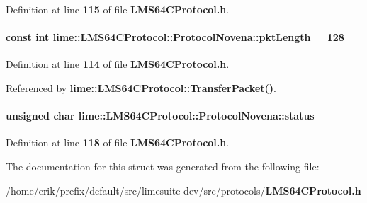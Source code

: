 Definition at line {\bf 115} of file {\bf L\+M\+S64\+C\+Protocol.\+h}.

\paragraph[{pkt\+Length}]{\setlength{\rightskip}{0pt plus 5cm}const {\bf int} lime\+::\+L\+M\+S64\+C\+Protocol\+::\+Protocol\+Novena\+::pkt\+Length = 128\hspace{0.3cm}{\ttfamily [static]}}\label{structlime_1_1LMS64CProtocol_1_1ProtocolNovena_a491fb2eb0bc679a44cf94b8ebf0810d7}


Definition at line {\bf 114} of file {\bf L\+M\+S64\+C\+Protocol.\+h}.



Referenced by {\bf lime\+::\+L\+M\+S64\+C\+Protocol\+::\+Transfer\+Packet()}.

\paragraph[{status}]{\setlength{\rightskip}{0pt plus 5cm}unsigned char lime\+::\+L\+M\+S64\+C\+Protocol\+::\+Protocol\+Novena\+::status}\label{structlime_1_1LMS64CProtocol_1_1ProtocolNovena_ad6f35fc9eb8dcbf3d95e9d1c846bf2f0}


Definition at line {\bf 118} of file {\bf L\+M\+S64\+C\+Protocol.\+h}.



The documentation for this struct was generated from the following file\+:\begin{DoxyCompactItemize}
\item 
/home/erik/prefix/default/src/limesuite-\/dev/src/protocols/{\bf L\+M\+S64\+C\+Protocol.\+h}\end{DoxyCompactItemize}

